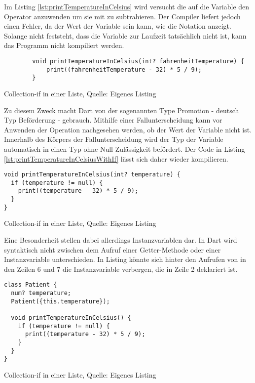 Im Listing \ref{lst:printTemperatureInCelsius}
wird versucht die  auf die Variable  den Operator \IC{-} anzuwenden um sie mit  zu subtrahieren. Der Compiler liefert jedoch einen Fehler, da der Wert der Variable  sein kann, wie die Notation  anzeigt. Solange nicht feststeht, dass die Variable zur Laufzeit tatsächlich nicht  ist, kann das Programm nicht kompiliert werden.

\ifincludeall
    \begin{listing}[ht]
        \begin{verbatim}
        void printTemperatureInCelsius(int? fahrenheitTemperature) {
            print((fahrenheitTemperature - 32) * 5 / 9);
        }
\end{verbatim}
        \caption[Collection-if in einer Liste]{Collection-if in einer Liste, Quelle: Eigenes Listing}
        \label{lst:printTemperatureInCelsius}
    \end{listing}
\fi

Zu diesem Zweck macht Dart von der sogenannten Type Promotion - deutsch Typ Beförderung - gebrauch. Mithilfe einer Fallunterscheidung kann vor Anwenden der Operation nachgesehen werden, ob der Wert der Variable nicht  ist. Innerhalb des Körpers der Fallunterscheidung wird der Typ der Variable automatisch in einen Typ ohne Null-Zulässigkeit befördert. Der Code in Listing \ref{lst:printTemperatureInCelsiusWithIf} lässt sich daher wieder kompilieren.

\ifincludeall
    \begin{listing}[ht]
        \begin{verbatim}
void printTemperatureInCelsius(int? temperature) {
  if (temperature != null) {
    print((temperature - 32) * 5 / 9);
  }
}
\end{verbatim}
        \caption[Collection-if in einer Liste]{Collection-if in einer Liste, Quelle: Eigenes Listing}
        \label{lst:printTemperatureInCelsiusWithIf}
    \end{listing}
\fi

Eine Besonderheit stellen dabei allerdings Instanzvariablen dar. In Dart wird syntaktisch nicht zwischen dem Aufruf einer Getter-Methode oder einer Instanzvariable unterschieden. In Listing \label{lst:Patient}
könnte sich hinter den Aufrufen von  in den Zeilen 6 und 7 die Instanzvariable verbergen, die in Zeile 2 deklariert ist.

\ifincludeall
    \begin{listing}[ht]
        \begin{verbatim}
class Patient {
  num? temperature;
  Patient({this.temperature});

  void printTemperatureInCelsius() {
    if (temperature != null) {
      print((temperature - 32) * 5 / 9);
    }
  }
}
    \end{verbatim}
        \caption[Collection-if in einer Liste]{Collection-if in einer Liste, Quelle: Eigenes Listing}
        \label{lst:PatientWithoutNullCheck}
    \end{listing}
\fi

